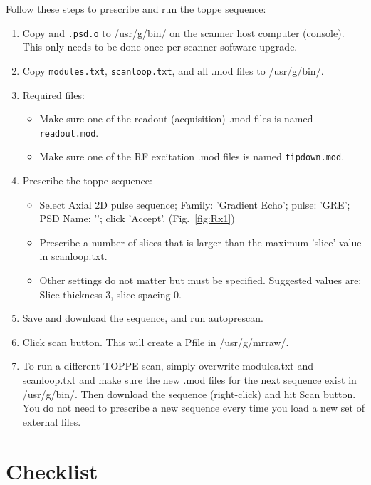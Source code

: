 Follow these steps to prescribe and run the toppe sequence:
\begin{enumerate}
	\item Copy {\tt \psdname} and {\tt \psdname.psd.o} to /usr/g/bin/ on the scanner host computer (console). This only needs to be done once per scanner software upgrade.
	\item Copy {\tt modules.txt}, {\tt scanloop.txt}, and all .mod files to /usr/g/bin/.
	\item Required files:
	\begin{itemize}
		\item Make sure one of the readout (acquisition) .mod files is named {\tt readout.mod}.
		\item Make sure one of the RF excitation .mod files is named {\tt tipdown.mod}.
	\end{itemize}
	\item Prescribe the toppe sequence:
\begin{itemize}
	\item Select Axial 2D pulse sequence; Family: 'Gradient Echo'; pulse: 'GRE'; PSD Name: '\psdname'; click 'Accept'. (Fig.~\ref{fig:Rx1})
	\item Prescribe a number of slices that is larger than the maximum 'slice' value in scanloop.txt.
	\item Other settings do not matter but must be specified. Suggested values are: Slice thickness 3, slice spacing 0.
\end{itemize}
	\item Save and download the sequence, and run autoprescan.
	\item Click scan button. This will create a Pfile in /usr/g/mrraw/.
	\item To run a different TOPPE scan, simply overwrite modules.txt and scanloop.txt and make sure the new .mod files for the next sequence exist in /usr/g/bin/. Then download the sequence (right-click) and hit Scan button. You do not need to prescribe a new sequence every time you load a new set of external files.
\end{enumerate}



\section{Checklist}

